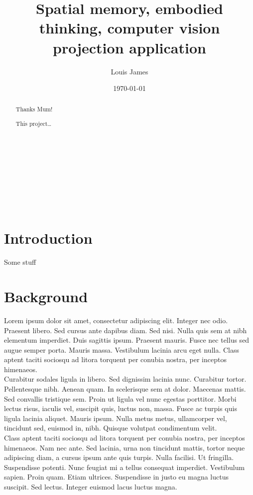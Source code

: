 \documentclass[12pt]{book}
\author{Louis James}
\date{\today}
\title{Spatial memory, embodied thinking, computer vision projection application}
\begin{document}
\maketitle

\renewcommand{\abstractname}{Acknowledgements}\\
\begin{abstract}
 Thanks Mum!
\end{abstract}
\newpage\\

\renewcommand{\abstractname}{Abstract}\\
\begin{abstract}
This project\ldots{}\\
\end{abstract}

\tableofcontents\\
\chapter{Introduction}
\label{sec:orge1472e0}

Some stuff \cite{VictorKayDynamicLand} \\

\chapter{Background}
\label{sec:org7e3a2db}
Lorem ipsum dolor sit amet, consectetur adipiscing elit. Integer nec odio. Praesent libero. Sed cursus ante dapibus diam. Sed nisi. Nulla quis sem at nibh elementum imperdiet. Duis sagittis ipsum. Praesent mauris. Fusce nec tellus sed augue semper porta. Mauris massa. Vestibulum lacinia arcu eget nulla. Class aptent taciti sociosqu ad litora torquent per conubia nostra, per inceptos himenaeos.\\

Curabitur sodales ligula in libero. Sed dignissim lacinia nunc. Curabitur tortor. Pellentesque nibh. Aenean quam. In scelerisque sem at dolor. Maecenas mattis. Sed convallis tristique sem. Proin ut ligula vel nunc egestas porttitor. Morbi lectus risus, iaculis vel, suscipit quis, luctus non, massa. Fusce ac turpis quis ligula lacinia aliquet. Mauris ipsum. Nulla metus metus, ullamcorper vel, tincidunt sed, euismod in, nibh. Quisque volutpat condimentum velit.\\

Class aptent taciti sociosqu ad litora torquent per conubia nostra, per inceptos himenaeos. Nam nec ante. Sed lacinia, urna non tincidunt mattis, tortor neque adipiscing diam, a cursus ipsum ante quis turpis. Nulla facilisi. Ut fringilla. Suspendisse potenti. Nunc feugiat mi a tellus consequat imperdiet. Vestibulum sapien. Proin quam. Etiam ultrices. Suspendisse in justo eu magna luctus suscipit. Sed lectus. Integer euismod lacus luctus magna.\\
\end{document}
